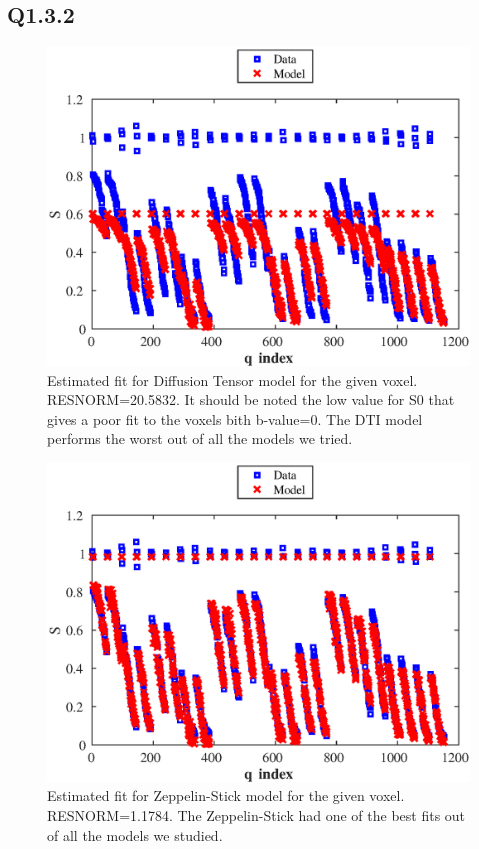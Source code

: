 \documentclass[11pt,a4paper,oneside]{report}
\begin{document}
\subsection*{Q1.3.2}

\begin{figure}[H]
\centering
\includegraphics[scale=0.8]{figures/q3/q132-DiffTensor.eps}
\caption{Estimated fit for Diffusion Tensor model for the given voxel. RESNORM=20.5832. It should be noted the low value for S0 that gives a poor fit to the voxels bith b-value=0. The DTI model performs the worst out of all the models we tried.}
\label{q132-DiffTensor}
\end{figure}

\begin{figure}[H]
\centering
\includegraphics[scale=0.8]{figures/q3/q132-ZeppStick.eps}
\caption{Estimated fit for Zeppelin-Stick model for the given voxel. RESNORM=1.1784. The Zeppelin-Stick had one of the best fits out of all the models we studied. }
\label{q132-ZeppStick}
\end{figure}
\end{document}
